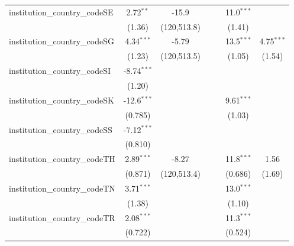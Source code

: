 \begin{tabular}{lcccccc}
   institution\_country\_codeSE          & 2.72$^{**}$    & -15.9         &               &            & 11.0$^{***}$  &   \\   
                                         & (1.36)         & (120,513.8)   &               &            & (1.41)        &   \\   
   institution\_country\_codeSG          & 4.34$^{***}$   & -5.79         &               &            & 13.5$^{***}$  & 4.75$^{***}$\\   
                                         & (1.23)         & (120,513.5)   &               &            & (1.05)        & (1.54)\\   
   institution\_country\_codeSI          & -8.74$^{***}$  &               &               &            &               &   \\   
                                         & (1.20)         &               &               &            &               &   \\   
   institution\_country\_codeSK          & -12.6$^{***}$  &               &               &            & 9.61$^{***}$  &   \\   
                                         & (0.785)        &               &               &            & (1.03)        &   \\   
   institution\_country\_codeSS          & -7.12$^{***}$  &               &               &            &               &   \\   
                                         & (0.810)        &               &               &            &               &   \\   
   institution\_country\_codeTH          & 2.89$^{***}$   & -8.27         &               &            & 11.8$^{***}$  & 1.56\\   
                                         & (0.871)        & (120,513.4)   &               &            & (0.686)       & (1.69)\\   
   institution\_country\_codeTN          & 3.71$^{***}$   &               &               &            & 13.0$^{***}$  &   \\   
                                         & (1.38)         &               &               &            & (1.10)        &   \\   
   institution\_country\_codeTR          & 2.08$^{***}$   &               &               &            & 11.3$^{***}$  &   \\   
                                         & (0.722)        &               &               &            & (0.524)       &   \\   

\end{tabular}
